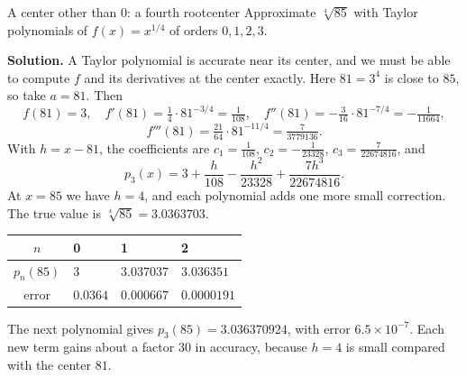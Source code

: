 \documentclass[11pt]{article}
\begin{document}
\begin{exmp}{A center other than $0$: a fourth root}{center}
Approximate $\sqrt[4]{85}$ with Taylor polynomials of $f(x)=x^{1/4}$ of orders $0,1,2,3$.

\textbf{Solution.} A Taylor polynomial is accurate near its center, and we must be able to compute $f$ and its derivatives at the center exactly. Here $81=3^4$ is close to $85$, so take $a=81$. Then
\[
f(81)=3,\quad f'(81)=\tfrac14\cdot81^{-3/4}=\tfrac1{108},\quad f''(81)=-\tfrac3{16}\cdot81^{-7/4}=-\tfrac1{11664},
\]
\[
f'''(81)=\tfrac{21}{64}\cdot81^{-11/4}=\tfrac7{3779136}.
\]
With $h=x-81$, the coefficients are $c_1=\frac1{108}$, $c_2=-\frac1{23328}$, $c_3=\frac7{22674816}$, and
\[
p_3(x)=3+\frac{h}{108}-\frac{h^2}{23328}+\frac{7h^3}{22674816}.
\]
At $x=85$ we have $h=4$, and each polynomial adds one more small correction. The true value is $\sqrt[4]{85}=3.0363703$.
\begin{center}
\begin{tabular}{@{}clll@{}}\toprule
$n$ & 0 & 1 & 2\\\midrule
$p_n(85)$ & $3$ & $3.037037$ & $3.036351$\\
error & $0.0364$ & $0.000667$ & $0.0000191$\\\bottomrule
\end{tabular}
\end{center}
The next polynomial gives $p_3(85)=3.036370924$, with error $6.5\times10^{-7}$. Each new term gains about a factor $30$ in accuracy, because $h=4$ is small compared with the center $81$.
\end{exmp}
\end{document}
